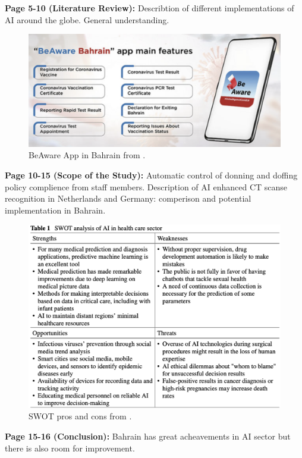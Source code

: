     \textbf{Page 5-10 (Literature Review):}
    Describtion of different implementations of AI around the globe. General understanding.
    \begin{figure}[H]
        \centering
        \includegraphics[width=1\textwidth]{figures/0023_SR07US23/fig1.png}
        \caption{BeAware App in Bahrain from \cite{x101}.}
        \label{fig1:0023_SR07US23}
    \end{figure}
    
    \textbf{Page 10-15 (Scope of the Study):}
    Automatic control of donning and doffing policy complience from staff members. Description of AI enhanced CT scanse recognition in Netherlands and Germany: comperison and potential implementation in Bahrain.
    \begin{figure}[H]
        \centering
        \includegraphics[width=1\textwidth]{figures/0023_SR07US23/fig3.png}
        \caption{SWOT pros and cons from \cite{x101}.}
        \label{fig3:0023_SR07US23}
    \end{figure}

    \textbf{Page 15-16 (Conclusion):}
    Bahrain has great acheavements in AI sector but there is also room for improvement.
    
